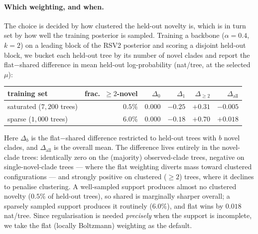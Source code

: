 \documentclass{article}
\begin{document}
\paragraph{Which weighting, and when.}
The choice is decided by how clustered the held-out novelty is, which is in turn set
by how well the training posterior is sampled. Training a backbone
($\alpha=0.4$, $k=2$) on a leading block of the RSV2 posterior and scoring a disjoint
held-out block, we bucket each held-out tree by its number of novel clades and report
the flat$-$shared difference in mean held-out log-probability (nat/tree, at the
selected $\mu$):
\begin{center}
\renewcommand{\arraystretch}{1.1}
\begin{tabular}{lrrrrr}
\hline
training set & frac.\ $\ge2$-novel & $\Delta_0$ & $\Delta_1$ & $\Delta_{\ge2}$ & $\Delta_{\text{all}}$ \\
\hline
saturated ($7{,}200$ trees) & $0.5\%$ & $0.000$ & $-0.25$ & $+0.31$ & $-0.005$ \\
sparse ($1{,}000$ trees)    & $6.0\%$ & $0.000$ & $-0.18$ & $+0.70$ & $\mathbf{+0.018}$ \\
\hline
\end{tabular}
\end{center}
Here $\Delta_b$ is the flat$-$shared difference restricted to held-out trees with
$b$ novel clades, and $\Delta_{\text{all}}$ is the overall mean. The difference lives
entirely in the novel-clade trees: identically zero on the (majority) observed-clade
trees, negative on single-novel-clade trees --- where the flat weighting diverts mass
toward clustered configurations --- and strongly positive on clustered ($\ge2$)
trees, where it declines to penalise clustering. A well-sampled support produces
almost no clustered novelty ($0.5\%$ of held-out trees), so shared is marginally
sharper overall; a sparsely sampled support produces it routinely ($6.0\%$), and flat
wins by $0.018$ nat/tree. Since regularisation is needed \emph{precisely} when the
support is incomplete, we take the flat (locally Boltzmann) weighting as the default.
\end{document}
